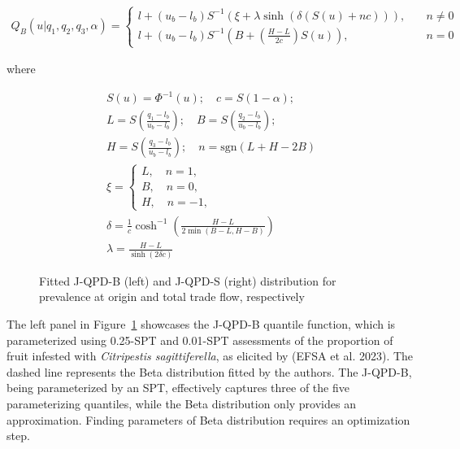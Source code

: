 \documentclass[
]{interact}
\begin{document}
\[
\begin{gathered}
Q_B(u\vert q_1, q_2, q_3, \alpha)=
\begin{cases}
l+(u_b-l_b)S^{-1}(\xi+\lambda\sinh(\delta(S(u)+nc))), \quad &n\neq0\\
l+(u_b-l_b)S^{-1}\left(B+\left(\frac{H-L}{2c}\right)S(u)\right), \quad &n=0
\end{cases}
\end{gathered}
\]

where

\[
\begin{gathered}
S(u)=\Phi^{-1}(u); \quad c=S(1-\alpha);\\
L=S\left(\frac{q_1-l_b}{u_b-l_b}\right); \quad  B=S\left(\frac{q_2-l_b}{u_b-l_b}\right);\\
H=S\left(\frac{q_3-l_b}{u_b-l_b}\right); \quad n=\text{sgn}(L+H-2B)\\
\xi=\begin{cases}L, \quad n=1,\\
B, \quad n=0,\\
H, \quad n=-1,\end{cases}\\
\delta=\frac{1}{c}\cosh^{-1}\left(\frac{H-L}{2\min(B-L,H-B)}\right)\\
\lambda=\frac{H-L}{\sinh(2\delta c)}
\end{gathered}
\]

\begin{figure}


\caption{\label{fig-jqpd1}Fitted J-QPD-B (left) and J-QPD-S (right)
distribution for prevalence at origin and total trade flow,
respectively}

\end{figure}%

The left panel in Figure~\ref{fig-jqpd1} showcases the J-QPD-B quantile
function, which is parameterized using 0.25-SPT and 0.01-SPT assessments
of the proportion of fruit infested with \emph{Citripestis
sagittiferella}, as elicited by (EFSA et al. 2023). The dashed line
represents the Beta distribution fitted by the authors. The J-QPD-B,
being parameterized by an SPT, effectively captures three of the five
parameterizing quantiles, while the Beta distribution only provides an
approximation. Finding parameters of Beta distribution requires an
optimization step.
\end{document}
